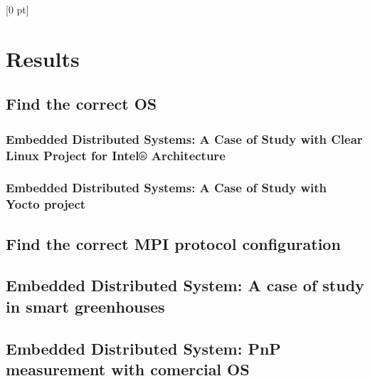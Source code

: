 \titlespacing{\chapter}{0 pt}{30 pt}{50 pt}[0 pt]
\titleformat{\section}{\Large\bfseries}{\thesection}{0 pt}{\hspace{30 pt}}
\titleformat{\subsection}{\large\bfseries}{\thesubsection}{0 pt}{\hspace{30 pt}}
\pagestyle{fancy}
\fancyhead[LO,LE]{\footnotesize\emph{\leftmark}}
\fancyhead[RO,RE]{\thepage}
\fancyfoot[CO,CE]{}

\chapter{Results}

\normalsize
\noindent

\section{Find the correct OS}
\noindent

    \subsection {Embedded Distributed Systems: A Case of Study with Clear Linux
    Project for Intel® Architecture}
    \noindent

    \subsection {Embedded Distributed Systems: A Case of Study with Yocto project}
    \noindent

\section{Find the correct MPI protocol configuration}
\noindent

\section{Embedded Distributed System: A case of study in smart greenhouses}
\noindent

\section{Embedded Distributed System: PnP measurement with comercial OS}
\noindent

\clearpage
